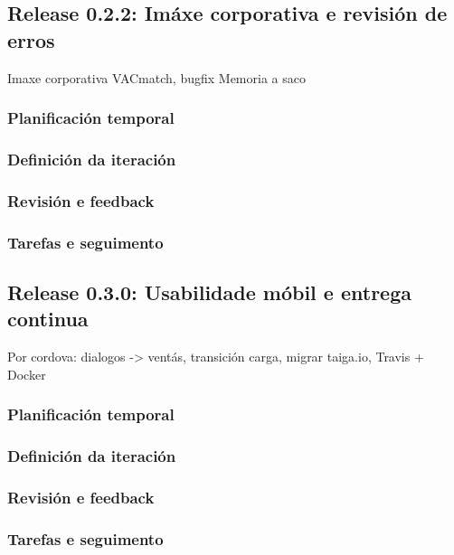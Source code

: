     \subsection{Release 0.2.2: Imáxe corporativa e revisión de erros}
    Imaxe corporativa VACmatch, bugfix
    Memoria a saco
      \subsubsection{Planificación temporal}
      \subsubsection{Definición da iteración}
      \subsubsection{Revisión e feedback}
      \subsubsection{Tarefas e seguimento}

    \subsection{Release 0.3.0: Usabilidade móbil e entrega continua}
    Por cordova: dialogos -> ventás, transición carga, migrar taiga.io, Travis + 
Docker
      \subsubsection{Planificación temporal}
      \subsubsection{Definición da iteración}
      \subsubsection{Revisión e feedback}
      \subsubsection{Tarefas e seguimento}



